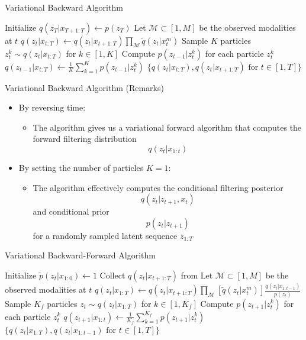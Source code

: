 \documentclass{beamer}
\begin{document}
\begin{frame}{Variational Backward Algorithm}
\begin{algorithmic}
\State Initialize $q(z_T|x_{T+1:T})\leftarrow p(z_T)$
\State Let $\mathcal{M}\subset[1,M]$ be the observed modalities at $t$
\State $q(z_t|x_{t:T})\leftarrow q(z_t|x_{t+1:T})\prod_\mathcal{M} \tilde{q}(z_t|x_t^m)$
\State Sample $K$ particles $z_t^k\sim q(z_t|x_{t:T})$ for $k\in[1,K]$
\State Compute $p(z_{t-1}|z_t^k)$ for each particle $z_t^k$
\State $q(z_{t-1}|x_{t:T})\leftarrow\frac{1}{K}\sum_{k=1}^K p(z_{t-1}|z_t^k)$
\EndFor
\State\Return$\{q(z_t|x_{t:T}),q(z_t|x_{t+1:T})\text{ for }t\in[1,T]\}$
\EndFunction
\end{algorithmic}
\end{frame}


\begin{frame}{Variational Backward Algorithm (Remarks)}
\begin{itemize}
\item By reversing time:
\begin{itemize}
\item The algorithm gives us a variational forward algorithm that computes the forward filtering distribution\[
q(z_t|x_{1:t})
\]
\end{itemize}
\item By setting the number of particles $K=1$:
\begin{itemize}
\item The algorithm effectively computes the conditional filtering posterior\[
q(z_t|z_{t+1},x_{t})
\]and conditional prior \[
p(z_t|z_{t+1})
\] for a randomly sampled latent sequence $z_{1:T}$
\end{itemize}
\end{itemize}
\end{frame}


\begin{frame}{Variational Backward-Forward Algorithm}
\begin{algorithmic}
\State Initialize $\tilde{p}(z_t|x_{1:0})\leftarrow 1$
\State Collect $q(z_t|x_{t+1:T})$ from 
\State Let $\mathcal{M}\subset[1,M]$ be the observed modalities at $t$
\State $q(z_t|x_{1:T})\leftarrow q(z_t|x_{t+1:T})\prod_\mathcal{M}[\tilde{q}(z_t|x_t^m)]\frac{q(z_t|x_{1:t-1})}{p(z_t)}$
\State Sample $K_f$ particles $z_t\sim q(z_t|x_{1:T})$ for $k\in[1,K_f]$
\State Compute $p(z_{t+1}|z_t^k)$ for each particle $z_t^k$
\State $q(z_{t+1}|x_{1:t})\leftarrow\frac{1}{K_f}\sum_{k=1}^{K_f}p(z_{t+1}|z_t^k)$
\EndFor
\State \Return$\{q(z_t|x_{1:T}),q(z_t|x_{1:t-1})\text{ for }t\in[1,T]\}$
\EndFunction
\end{algorithmic}
\end{frame}
\end{document}
